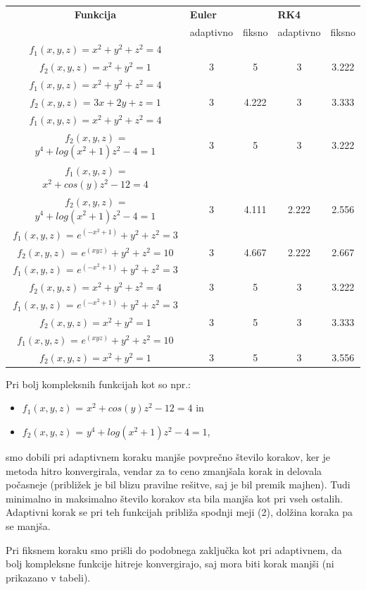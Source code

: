 \documentclass[12pt]{article}
\begin{document}
	\begin{tabular}{|c | c | c | c | c |} 
		\hline
		\textbf{Funkcija} &\multicolumn{2}{|l|}{\textbf{Euler}} &\multicolumn{2}{|l|}{\textbf{RK4}}\\                
		\small &adaptivno & fiksno & adaptivno & fiksno \\ 
		\hline
		\small{}$f_{1}(x,y,z)=x^{2} + y^{2}+ z^{2}=4$ & & & &\\ 
		\small{}$f_{2}(x,y,z)=x^{2} + y^{2}    =1$  & 3 & 5 & 3 & 3.222 \\
		\hline
		\small{}$f_{1}(x,y,z)=x^{2} + y^{2}+ z^{2}=4$ & & & &\\ 
		\small{}$f_{2}(x,y,z)$ = $3x + 2y + z = 1$  & 3 & 4.222 & 3 & 3.333 \\
		\hline
		\small{}$f_{1}(x,y,z)=x^{2} + y^{2}+ z^{2}=4$ & & & &\\ 
		\small{}$f_{2}(x,y,z)$ = $y^4 + log(x^2 + 1)z^2 - 4 = 1$  & 3 & 5 & 3 & 3.222 \\
		\hline
		\small{}$f_{1}(x,y,z)$ = $x^2 + cos(y)z^2 - 12 = 4$ & & & &\\ 
		\small{}$f_{2}(x,y,z)$ = $y^4 + log(x^2 + 1)z^2 - 4 = 1$  & 3 & 4.111 & 2.222 & 2.556 \\
		\hline
		\small{}$f_{1}(x,y,z)$ = $e^{(-x^{2}+1)}+y^{2}+z^{2} = 3$ & & & &\\ 
		\small{}$f_{2}(x,y,z)$ = $e^{(xyz)}+y^{2}+z^{2} = 10$  & 3 & 4.667 & 2.222 & 2.667 \\
		\hline
		\small{}$f_{1}(x,y,z)$ = $e^{(-x^{2}+1)}+y^{2}+z^{2} = 3$ & & & &\\ 
		\small{}$f_{2}(x,y,z)=x^{2} + y^{2}+ z^{2}=4$  & 3 & 5 & 3 & 3.222 \\
		\hline
		\small{}$f_{1}(x,y,z)$ = $e^{(-x^{2}+1)}+y^{2}+z^{2} = 3$ & & & &\\ 
		\small{}$f_{2}(x,y,z)=x^{2} + y^{2}    =1$  & 3 & 5 & 3 & 3.333 \\
		\hline
		\small{}$f_{1}(x,y,z)$ = $e^{(xyz)}+y^{2}+z^{2} = 10$ & & & &\\ 
		\small{}$f_{2}(x,y,z)=x^{2} + y^{2}    =1$  & 3 & 5 & 3 & 3.556 \\
		\hline
	\end{tabular}
	\newline
	\newline
	Pri bolj kompleksnih funkcijah kot so npr.:
	\begin{itemize}
		\item $f_{1}(x,y,z)$ = $x^2 + cos(y)z^2 - 12 = 4$  in \item $f_{2}(x,y,z)$ = $y^4 + log(x^2 + 1)z^2 - 4 = 1$,
	\end{itemize}
	smo dobili pri adaptivnem koraku manjše povprečno število korakov, ker je metoda hitro konvergirala, vendar za to ceno zmanjšala korak in delovala počasneje (približek je bil blizu pravilne rešitve, saj je bil premik majhen). Tudi minimalno in maksimalno število korakov sta bila manjša kot pri vseh ostalih. Adaptivni korak se pri teh funkcijah približa spodnji meji (2), dolžina koraka pa se manjša. 
	\par Pri fiksnem koraku smo prišli do podobnega zaključka kot pri adaptivnem, da bolj kompleksne funkcije hitreje konvergirajo, saj mora biti korak manjši (ni prikazano v tabeli).
\end{document}

